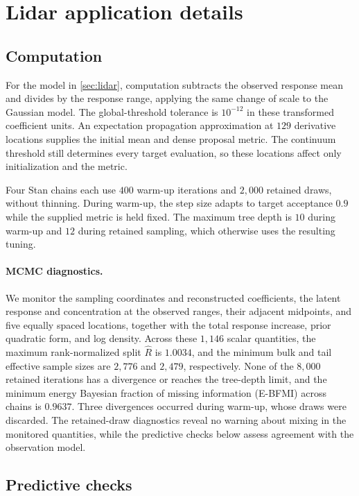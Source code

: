 \section{Lidar application details}
\label{app:lidar-computation}

\subsection{Computation}

For the model in \cref{sec:lidar}, computation subtracts the observed
response mean and divides by the response range, applying the same
change of scale to the Gaussian model. The global-threshold tolerance
is $10^{-12}$ in these transformed coefficient units. An expectation
propagation approximation at $129$ derivative locations supplies the
initial mean and dense proposal metric. The continuum threshold
still determines every target evaluation, so these locations affect
only initialization and the metric.

Four Stan chains each use $400$ warm-up iterations and $2{,}000$
retained draws, without thinning. During warm-up, the step size adapts
to target acceptance $0.9$ while the supplied metric is held fixed.
The maximum tree depth is $10$ during warm-up and $12$ during
retained sampling, which otherwise uses the resulting tuning.

\paragraph{MCMC diagnostics.}
We monitor the sampling coordinates and reconstructed coefficients,
the latent response and concentration at the observed ranges, their
adjacent midpoints, and five equally spaced locations, together with
the total response increase, prior quadratic form, and log density.
Across these $1{,}146$ scalar quantities, the maximum rank-normalized
split $\widehat R$ is $1.0034$, and the minimum bulk and tail effective
sample sizes are $2{,}776$ and $2{,}479$, respectively. None of the
$8{,}000$ retained iterations has a divergence or reaches the
tree-depth limit, and the minimum energy Bayesian fraction of missing
information (E-BFMI) across chains is $0.9637$. Three divergences
occurred during warm-up, whose draws were discarded. The retained-draw
diagnostics reveal no warning about mixing in the monitored quantities,
while the predictive checks below assess agreement with the observation
model.

\subsection{Predictive checks}


\FloatBarrier
